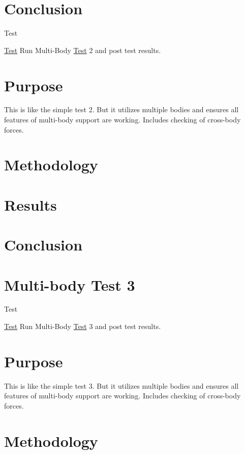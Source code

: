 \section*{Conclusion}

\begin{DoxyRefDesc}{Test}
\item[\hyperlink{test__test000011}{Test}]Run Multi-\/\-Body \hyperlink{class_test}{Test} 2 and post test results.\end{DoxyRefDesc}


\section*{Purpose}

This is like the simple test 2. But it utilizes multiple bodies and ensures all features of multi-\/body support are working. Includes checking of cross-\/body forces.

\section*{Methodology}

\section*{Results}

\section*{Conclusion}\hypertarget{MultiBodyTest3}{}\section{Multi-\/body Test 3}\label{MultiBodyTest3}
\begin{DoxyRefDesc}{Test}
\item[\hyperlink{test__test000003}{Test}]Run Multi-\/\-Body \hyperlink{class_test}{Test} 3 and post test results.\end{DoxyRefDesc}


\section*{Purpose}

This is like the simple test 3. But it utilizes multiple bodies and ensures all features of multi-\/body support are working. Includes checking of cross-\/body forces.

\section*{Methodology}

